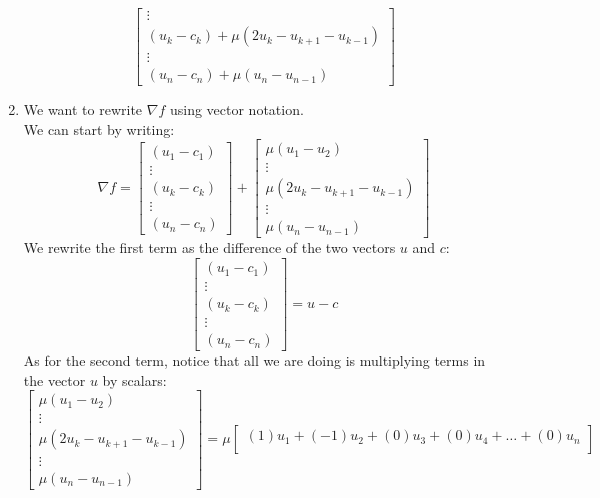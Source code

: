 \documentclass[12pt]{article}
\begin{document}
\begin{enumerate}[label=\alph*)]
\[\begin{bmatrix}
        \vdots \\
        (u_k - c_k) + \mu(2u_k - u_{k+1} - u_{k-1}) \\
        \vdots \\
        (u_n - c_n) + \mu(u_{n} - u_{n-1})
        \end{bmatrix} \]
        \item 
        We want to rewrite $\nabla f$ using vector
        notation. \\
        We can start by writing:
        \[ \nabla f = \begin{bmatrix}
        (u_1 - c_1) \\
        \vdots \\
        (u_k - c_k) \\
        \vdots \\
        (u_n - c_n)
        \end{bmatrix} + \begin{bmatrix}
        \mu(u_1-u_{2}) \\
        \vdots \\
        \mu(2u_k - u_{k+1} - u_{k-1}) \\
        \vdots \\
        \mu(u_{n} - u_{n-1})
        \end{bmatrix} \]
        We rewrite the first term as the
        difference of the two vectors $u$ and $c$:
        \[\begin{bmatrix}
            (u_1 - c_1) \\
            \vdots \\
            (u_k - c_k) \\
            \vdots \\
            (u_n - c_n)
        \end{bmatrix}  = u - c \]
        As for the second term,
        notice that all we are doing is multiplying
        terms in the vector $u$
        by scalars:
        \[ \begin{bmatrix}
            \mu(u_1-u_{2}) \\
            \vdots \\
            \mu(2u_k - u_{k+1} - u_{k-1}) \\
            \vdots \\
            \mu(u_{n} - u_{n-1})
        \end{bmatrix} 
        = \mu \begin{bmatrix}
            (1)u_1 + (-1)u_{2} + (0)u_3 + (0)u_4
            + \dots + (0)u_n \\

\end{bmatrix}\]
\end{enumerate}
\end{document}
